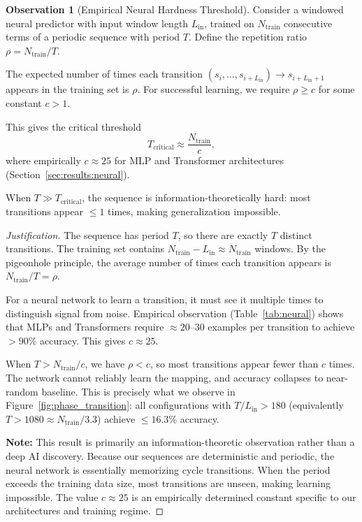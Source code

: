 \documentclass[11pt]{article}
\theoremstyle{plain}
\theoremstyle{definition}
\newtheorem{observation}[theorem]{Observation}
\begin{document}
\begin{observation}[Empirical Neural Hardness Threshold]
\label{obs:neural}
Consider a windowed neural predictor with input window length $L_{\mathrm{in}}$, trained on $N_{\mathrm{train}}$ consecutive terms of a periodic sequence with period $T$. Define the repetition ratio $\rho = N_{\mathrm{train}}/T$.

The expected number of times each transition $(s_i, \ldots, s_{i+L_{\mathrm{in}}}) \to s_{i+L_{\mathrm{in}}+1}$ appears in the training set is $\rho$. For successful learning, we require $\rho \geq c$ for some constant $c > 1$.

This gives the critical threshold
\begin{equation}
  T_{\mathrm{critical}} \approx \frac{N_{\mathrm{train}}}{c},
\end{equation}
where empirically $c \approx 25$ for MLP and Transformer architectures (Section~\ref{sec:results:neural}).

When $T \gg T_{\mathrm{critical}}$, the sequence is information-theoretically hard: most transitions appear $\leq 1$ times, making generalization impossible.
\end{observation}

\begin{proof}[Justification]
The sequence has period $T$, so there are exactly $T$ distinct transitions. The training set contains $N_{\mathrm{train}} - L_{\mathrm{in}} \approx N_{\mathrm{train}}$ windows. By the pigeonhole principle, the average number of times each transition appears is $N_{\mathrm{train}}/T = \rho$.

For a neural network to learn a transition, it must see it multiple times to distinguish signal from noise. Empirical observation (Table~\ref{tab:neural}) shows that MLPs and Transformers require $\approx 20$--$30$ examples per transition to achieve $>90\%$ accuracy. This gives $c \approx 25$.

When $T > N_{\mathrm{train}}/c$, we have $\rho < c$, so most transitions appear fewer than $c$ times. The network cannot reliably learn the mapping, and accuracy collapses to near-random baseline. This is precisely what we observe in Figure~\ref{fig:phase_transition}: all configurations with $T/L_{\mathrm{in}} > 180$ (equivalently $T > 1080 \approx N_{\mathrm{train}}/3.3$) achieve $\leq 16.3\%$ accuracy.

\textbf{Note:} This result is primarily an information-theoretic observation rather than a deep AI discovery. Because our sequences are deterministic and periodic, the neural network is essentially memorizing cycle transitions. When the period exceeds the training data size, most transitions are unseen, making learning impossible. The value $c \approx 25$ is an empirically determined constant specific to our architectures and training regime.
\end{proof}
\end{document}

